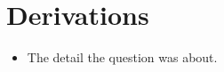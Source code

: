 \documentclass[10pt]{beamer}
\begin{document}

\begin{frame}
  \printbibliography[sorting=nyt]
\end{frame}


\appendix

\backupdividerframe

\outlineframe[index]

\section{Derivations}

\begin{contentframe}[title=A Backup Slide, label=slide:backup-detail,
                     links={\slideback{slide:introduction}}]

    \begin{itemize}
        \item The detail the question was about.
    \end{itemize}

\end{contentframe}

\end{document}
